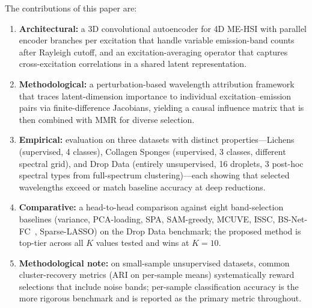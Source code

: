 The contributions of this paper are:
\begin{enumerate}
    \item \textbf{Architectural:} a 3D convolutional autoencoder for 4D ME-HSI with parallel encoder branches per excitation that handle variable emission-band counts after Rayleigh cutoff, and an excitation-averaging operator that captures cross-excitation correlations in a shared latent representation.
    \item \textbf{Methodological:} a perturbation-based wavelength attribution framework that traces latent-dimension importance to individual excitation--emission pairs via finite-difference Jacobians, yielding a causal influence matrix that is then combined with MMR for diverse selection.
    \item \textbf{Empirical:} evaluation on three datasets with distinct properties---Lichens (supervised, 4 classes), Collagen Sponges (supervised, 3 classes, different spectral grid), and Drop Data (entirely unsupervised, 16 droplets, 3 post-hoc spectral types from full-spectrum clustering)---each showing that selected wavelengths exceed or match baseline accuracy at deep reductions.
    \item \textbf{Comparative:} a head-to-head comparison against eight band-selection baselines (variance, PCA-loading, SPA, SAM-greedy, MCUVE, ISSC, BS-Net-FC~\cite{cai2020bsnet}, Sparse-LASSO) on the Drop Data benchmark; the proposed method is top-tier across all $K$ values tested and wins at $K=10$.
    \item \textbf{Methodological note:} on small-sample unsupervised datasets, common cluster-recovery metrics (ARI on per-sample means) systematically reward selections that include noise bands; per-sample classification accuracy is the more rigorous benchmark and is reported as the primary metric throughout.
\end{enumerate}